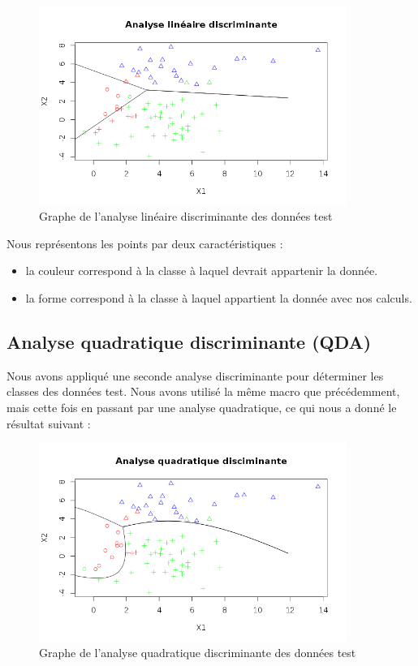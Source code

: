 \documentclass[a4paper,11pt]{article}
\begin{document}
  \begin{figure}[h]
   \center
   \includegraphics[width=10cm]{lineaire_discri.png}
   \caption{Graphe de l'analyse linéaire discriminante des données test}
  \end{figure}
  
  Nous représentons les points par deux caractéristiques :
  \begin{itemize}
   \item la couleur correspond à la classe à laquel devrait appartenir la donnée.
   \item la forme correspond à la classe à laquel appartient la donnée avec nos calculs.
  \end{itemize}
  
  \subsection{Analyse quadratique discriminante (QDA)}
  
  Nous avons appliqué une seconde analyse discriminante pour déterminer les classes des données test.
  Nous avons utilisé la même macro que précédemment, mais cette fois en passant par une analyse quadratique, 
  ce qui nous a donné le résultat suivant :\\
  
  \begin{figure}[h]
   \center
   \includegraphics[width=10cm]{quadratique.png}
   \caption{Graphe de l'analyse quadratique discriminante des données test}
  \end{figure}
  
\end{document}
